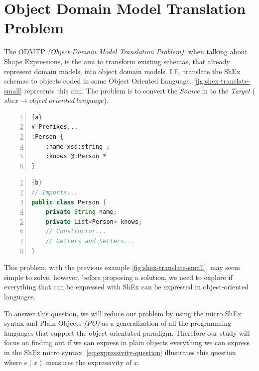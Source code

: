 \chapter{Object Domain Model Translation Problem}
\label{ch:odm-transl}

The ODMTP \textit{(Object Domain Model Translation Problem)}, when talking about
Shape Expressions, is the aim to transform existing schemas, that already represent
domain models, into object domain models. I.E, translate the ShEx
schemas to objects coded in some Object Oriented Language. \cref{fig:shex-translate-small}
represents this aim. The problem is to convert the \textit{Source} in to the \textit{Target}
($shex \rightarrow object\ oriented\ language$).

\begin{center}
	\noindent\begin{minipage}[t]{.4\textwidth}
        \begin{lstlisting}[frame=topline,numbers=left,title=\scriptsize{Person Schema (Source)},
            basicstyle=\ttfamily\scriptsize]{a}
# Prefixes...
:Person {
	:name xsd:string ;
	:knows @:Person *
}
		\end{lstlisting}
	\end{minipage}\hfill
	\begin{minipage}[t]{.5\textwidth}
        \begin{lstlisting}[language=Java, frame=t,numbers=left,title=\scriptsize{Person Java Object (Target)},
            basicstyle=\ttfamily\scriptsize]{b}
// Imports...
public class Person {
	private String name;
	private List<Person> knows;
	// Constructor...
	// Getters and Setters...
}
		\end{lstlisting}
	\end{minipage}
	\label{fig:shex-translate-small}
\end{center}

This problem, with the previous example \cref{fig:shex-translate-small}, may seem simple to solve, however,
before proposing a solution, we need to explore if everything that can be expressed with ShEx can be
expressed in object-oriented languages.

To answer this question, we will reduce our problem by using the micro ShEx syntax and Plain Objects \textit{(PO)}
\cite{fowler1997analysis} as a generalization of all the programming languages that support the object orientated
paradigm. Therefore our study will focus on finding out if we can express in plain objects everything we can express
in the ShEx micro syntax. \cref{eq:expressivity-question} illustrates this question where $e(x)$ measures the
expressivity \cite{felleisen1991expressive} of $x$.

